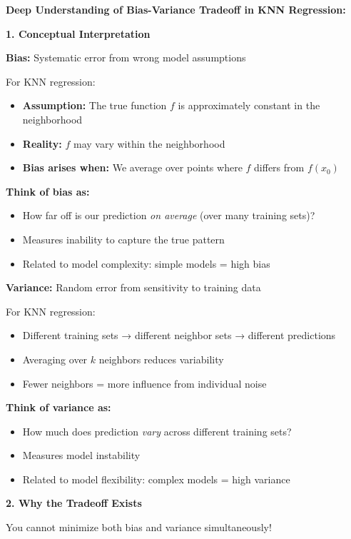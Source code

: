 \documentclass[12pt]{article}
\begin{document}
\begin{explanation}
\textbf{Deep Understanding of Bias-Variance Tradeoff in KNN Regression:}

\textbf{1. Conceptual Interpretation}

\textbf{Bias:} Systematic error from wrong model assumptions

For KNN regression:
\begin{itemize}
    \item \textbf{Assumption:} The true function \(f\) is approximately constant in the neighborhood
    \item \textbf{Reality:} \(f\) may vary within the neighborhood
    \item \textbf{Bias arises when:} We average over points where \(f\) differs from \(f(x_0)\)
\end{itemize}

\textbf{Think of bias as:}
\begin{itemize}
    \item How far off is our prediction \textit{on average} (over many training sets)?
    \item Measures inability to capture the true pattern
    \item Related to model complexity: simple models = high bias
\end{itemize}

\textbf{Variance:} Random error from sensitivity to training data

For KNN regression:
\begin{itemize}
    \item Different training sets → different neighbor sets → different predictions
    \item Averaging over \(k\) neighbors reduces variability
    \item Fewer neighbors = more influence from individual noise
\end{itemize}

\textbf{Think of variance as:}
\begin{itemize}
    \item How much does prediction \textit{vary} across different training sets?
    \item Measures model instability
    \item Related to model flexibility: complex models = high variance
\end{itemize}

\textbf{2. Why the Tradeoff Exists}

You cannot minimize both bias and variance simultaneously!


\end{explanation}
\end{document}
